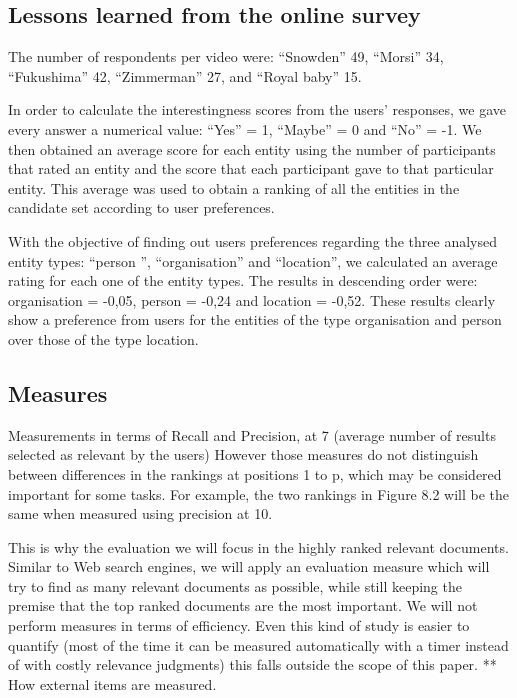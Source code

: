 \documentclass{llncs}
\begin{document}
\subsection{Lessons learned from the online survey}
\label{sec:LessonsLearned}

The number of respondents per video were: ``Snowden'' 49, ``Morsi'' 34, ``Fukushima'' 42, ``Zimmerman'' 27, and ``Royal baby'' 15.

In order to calculate the interestingness scores from the users’ responses, we gave every answer a numerical value: ``Yes'' = 1, ``Maybe'' = 0 and ``No'' = -1.  We then obtained an average score for each entity using the number of participants that rated an entity and the score that each participant gave to that particular entity.  This average was used to obtain a ranking of all the entities in the candidate set according to user preferences. 

With the objective of finding out users preferences regarding the three analysed entity types: ``person '', ``organisation'' and ``location'', we calculated an average rating for each one of the entity types. The results in descending order were: organisation = -0,05, person = -0,24  and location = -0,52. These results clearly show a preference from users for the entities of the type organisation and person over those of the type location.

\subsection{Measures}
Measurements in terms of Recall and Precision, at 7 (average number of results selected as relevant by the users)
However those measures do not distinguish between differences in the rankings at positions 1 to p, which may be considered important for some tasks. For example, the two rankings in Figure 8.2 will be the same when measured using precision at 10.

This is why  the evaluation we will focus in the highly ranked relevant documents. Similar to Web search engines, we will apply an evaluation measure which will try to find as many relevant documents as possible, while still keeping the  premise that the top ranked documents are the most important. We will not perform measures in terms of efficiency. Even this kind of study is easier to quantify (most of the time it can be measured automatically with a timer instead of with costly relevance judgments) this falls outside the scope of this paper.
** How external items are measured.
\end{document}
